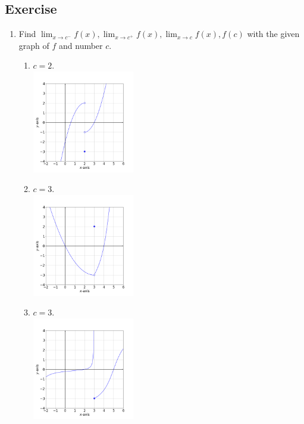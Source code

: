 \documentclass[11pt]{book}
\begin{document}
\subsection*{Exercise}

\begin{enumerate}[label=\arabic*.]
    \item Find $\displaystyle\lim_{x\to c^-}f(x), \lim_{x\to c^+}f(x), \lim_{x\to c}f(x), f(c)$ with the given graph of $f$ and number $c$.
    \begin{multicols}{2}
        \begin{enumerate}
            \item $c=2$.\\
            \includegraphics[width=0.37\textwidth]{limit_ex_1.png}
            \item $c=3$.\\
            \includegraphics[width=0.37\textwidth]{limit_ex_2.png}
            \item $c=3$.\\
            \includegraphics[width=0.37\textwidth]{limit_ex_3.png}

\end{enumerate}
\end{multicols}
\end{enumerate}
\end{document}
